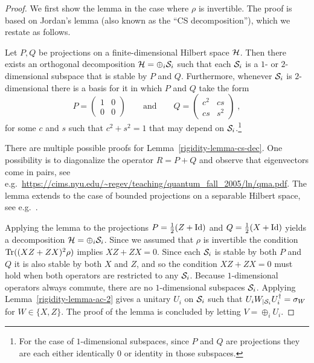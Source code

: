\begin{proof}
We first show the lemma in the case where $\rho$ is invertible. The proof is based on Jordan's lemma (also known as the ``CS decomposition''), which we restate as follows. 


\begin{lemma}\label{lemma-cs-dec}
Let $P,Q$ be projections on a finite-dimensional Hilbert space $\mathcal{H}$. Then there exists an orthogonal decomposition $\mathcal{H} = \oplus_i \mathcal{S}_i$ such that each $\mathcal{S}_i$ is a $1$- or $2$-dimensional subspace that is stable by $P$ and $Q$. Furthermore, whenever $\mathcal{S}_i$ is $2$-dimensional there is a basis for it in which $P$ and $Q$ take the form
\begin{equation}\label{equation-pq-form}
 P = \begin{pmatrix} 1 & 0 \\ 0 & 0 \end{pmatrix} \qquad \text{and} \qquad Q = \begin{pmatrix} c^2 & cs \\ cs & s^2 \end{pmatrix}\;,
\end{equation}
 for some $c$ and $s$ such that $c^2+s^2=1$ that may depend on $\mathcal{S}_i$.\footnote{For the case of $1$-dimensional subspaces, since $P$ and $Q$ are projections they are each either identically $0$ or identity in those subspaces.}
\end{lemma} 

There are multiple possible proofs for Lemma~\ref{rigidity-lemma-cs-dec}. One possibility is to diagonalize the operator $R=P+Q$ and observe that eigenvectors come in pairs, see e.g.~\url{https://cims.nyu.edu/~regev/teaching/quantum_fall_2005/ln/qma.pdf}. The lemma extends to the case of bounded projections on a separable Hilbert space, see e.g.~\cite[Theorem 1.1]{bottcher2010gentle}.

Applying the lemma to the projections $P = \frac{1}{2}(Z+\mathop{\rm Id}\nolimits)$ and $Q = \frac{1}{2}(X+\mathop{\rm Id}\nolimits)$ yields a decomposition $\mathcal{H} = \oplus_i \mathcal{S}_i$. Since we assumed that $\rho$ is invertible the condition $\mathrm{Tr}((XZ+ZX)^2\rho)$ implies $XZ+ZX=0$. Since each $\mathcal{S}_i$ is stable by both $P$ and $Q$ it is also stable by both $X$ and $Z$, and so the condition $XZ+ZX=0$ must hold when both operators are restricted to any $\mathcal{S}_i$. Because $1$-dimensional operators always commute, there are no $1$-dimensional subspaces $\mathcal{S}_i$. Applying Lemma~\ref{rigidity-lemma-ac-2} gives a unitary $U_i$ on $\mathcal{S}_i$ such that $U_i W_{|\mathcal{S}_i} U_i^\dagger = \sigma_W$ for $W\in \{X,Z\}$. The proof of the lemma is concluded by letting $V = \oplus_i U_i$. 


\end{proof}
